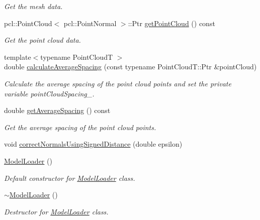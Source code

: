 \begin{DoxyCompactItemize}
\begin{DoxyCompactList}\small\item\em Get the mesh data. \end{DoxyCompactList}\item 
pcl\+::\+Point\+Cloud$<$ pcl\+::\+Point\+Normal $>$\+::Ptr \hyperlink{classvisioncraft_1_1ModelLoader_a3de1482844c50ad81dfa4b979913267c}{get\+Point\+Cloud} () const
\begin{DoxyCompactList}\small\item\em Get the point cloud data. \end{DoxyCompactList}\item 
{\footnotesize template$<$typename Point\+CloudT $>$ }\\double \hyperlink{classvisioncraft_1_1ModelLoader_a70e795be70bf958135b34740ca2bc7dd}{calculate\+Average\+Spacing} (const typename Point\+Cloud\+T\+::\+Ptr \&point\+Cloud)
\begin{DoxyCompactList}\small\item\em Calculate the average spacing of the point cloud points and set the private variable point\+Cloud\+Spacing\+\_\+. \end{DoxyCompactList}\item 
double \hyperlink{classvisioncraft_1_1ModelLoader_ab74391644bf2539d37c072f4bb651254}{get\+Average\+Spacing} () const
\begin{DoxyCompactList}\small\item\em Get the average spacing of the point cloud points. \end{DoxyCompactList}\item 
void \hyperlink{classvisioncraft_1_1ModelLoader_aea05858fcfeca8281df779dc8ba08acf}{correct\+Normals\+Using\+Signed\+Distance} (double epsilon)
\item 
\hyperlink{classvisioncraft_1_1ModelLoader_af5ea231cff5edd6199497c414f0bd079}{Model\+Loader} ()
\begin{DoxyCompactList}\small\item\em Default constructor for \hyperlink{classvisioncraft_1_1ModelLoader}{Model\+Loader} class. \end{DoxyCompactList}\item 
\hyperlink{classvisioncraft_1_1ModelLoader_a64f9d6f1d16b030b7934f8b4bbcd5ef9}{$\sim$\+Model\+Loader} ()
\begin{DoxyCompactList}\small\item\em Destructor for \hyperlink{classvisioncraft_1_1ModelLoader}{Model\+Loader} class. \end{DoxyCompactList}\item 

\end{DoxyCompactItemize}
